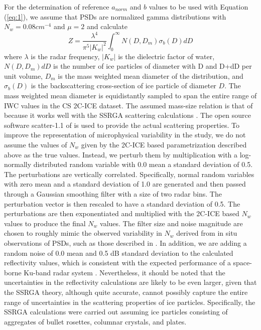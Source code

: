 \documentclass{ametsocV6.1}
\begin{document}
For the determination of reference $a_{norm}$ and $b$ values to be used with Equation (\ref{eq:1}), we assume that PSDs are normalized gamma  distributions with $N_w=0.08cm^{-4}$ and $\mu=2$ and calculate 
\begin{equation}
 Z=\frac {\lambda ^4} {\pi ^5 |K_w|^2} \int_0^{\infty} N(D,D_m) \sigma _b(D) dD
\end{equation}
where $\lambda$ is the radar frequency, $|K_w|$ is the dielectric factor of water, $N(D,D_m) dD$ is the number of ice particles of diameter with D and D+dD per unit volume, $D_m$ is the mass weighted mean diameter of the distribution, and $\sigma _b(D)$ is the backscattering cross-section of ice particle of diameter $D$. The mass weighted mean diameter is equidistantly sampled to span the entire range of IWC values in the CS 2C-ICE dataset. The assumed mass-size relation is that of \cite{brown1995improved} because it works well with the SSRGA scattering calculations \citep{heymsfield2022impacts}.  The open source software scatter-1.1 of \citep{scatter-1.1} is used to provide the actual scattering properties. To improve the representation of microphysical variability in the study, we do not assume the values of $N_w$ given by the 2C-ICE based parametrization described above as the true values. Instead, we perturb them by multiplication with a log-normally distributed random variable with 0.0 mean a standard deviation of 0.5.  The perturbations are vertically correlated. Specifically, normal random variables with zero mean and a standard deviation of 1.0 are generated and then passed through a Gaussian smoothing filter \citep{nixon2019} with a size of two radar bins. The perturbation vector is then rescaled to have a standard deviation of 0.5.  The perturbations are then exponentiated and multiplied with the 2C-ICE based $N_w$ values to produce the final $N_w$ values.  The filter size and noise magnitude are chosen to roughly mimic the observed variability in $N_w$ derived from in situ observations of PSDs, such as those described in \cite{heymsfield2022impacts}. In addition, we are adding a random noise of 0.0 mean and 0.5 dB standard deviation to the calculated reflectivity values, which is consistent with the expected performance of a space-borne Ku-band radar system \citep{takahashi2008}.  Nevertheless, it should be noted that the uncertainties in the reflectivity calculations are likely to be even larger, given that the SSRGA theory, although quite accurate, cannot possibly capture the entire range of uncertainties in the scattering properties of ice particles. Specifically, the SSRGA calculations were carried out assuming ice particles consisting of aggregates of bullet rosettes, columnar crystals, and plates.
\end{document}
